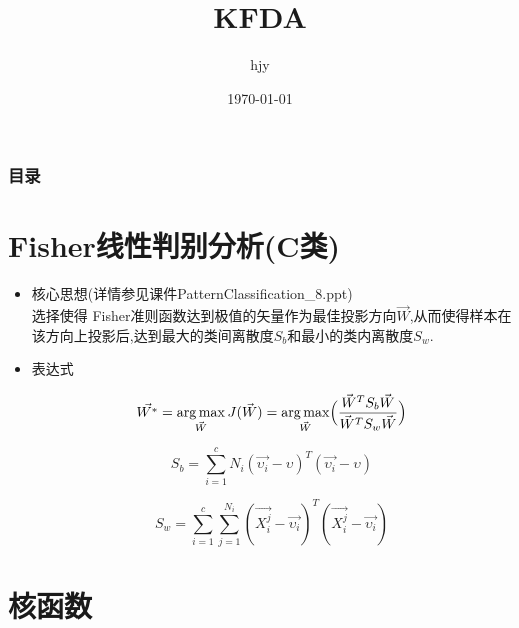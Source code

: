 \documentclass[12pt,a4paper,CJK]{beamer}
\author{hjy}
\title{KFDA}
\institute{TongJi University}
\date{\today}
\DeclareMathOperator*{\argmax}{arg\,max}
\begin{document}
\begin{CJK*}{UTF8}{gkai}
\begin{frame} 				
	\titlepage 
\end{frame}
	
\begin{frame}
	\frametitle{目录}
	\tableofcontents
\end{frame}
  
\section{Fisher线性判别分析(C类)}
\begin{frame}{\secname}
	\begin{itemize}
	\item 核心思想(详情参见课件PatternClassification\_{}8.ppt)\\
		选择使得 Fisher准则函数达到极值的矢量作为最佳投影方向$\overrightarrow{W}$,从而使得样本在该方向上投影后,达到最大的类间离散度$S_b$和最小的类内离散度$S_w$.
	\item 表达式\\
		\begin{displaybox}{90mm}
		\[ 			
 			\vec{W^*} = 
 			\argmax_{\vec{W}} J(\vec{W})=
 			\argmax_{\vec{W}} \Bigl(
 			\frac{\vec{W}^T S_b \vec{W}}{\vec{W}^T S_w \vec{W}}
 			\Bigr)
 		\]
 			
 		\[
 			S_b = \sum_{i=1}^{c} N_i(\vec{\upsilon_i}-\upsilon)^T(\vec{\upsilon_i}-\upsilon)
 		\]
 		
 		\[
 			S_w = \sum_{i=1}^{c} \sum_{j=1}^{N_i}(\vec{X_i^j}-\vec{\upsilon_i})^T(\vec{X_i^j}-\vec{\upsilon_i})
 		\]
 		
		\end{displaybox}
	\end{itemize}
\end{frame}


\section{核函数}

\end{CJK*}
\end{document}
